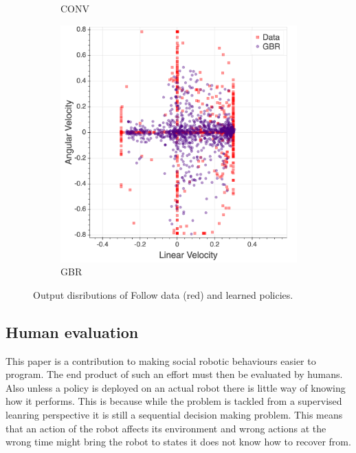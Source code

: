 \documentclass[letterpaper, 10 pt, conference]{ieeeconf}
\begin{document}
\begin{figure}[tbh]
\begin{subfigure}[b]{0.45\columnwidth}
    \caption{CONV}
    \label{fig:data}
  \end{subfigure}
  \hspace{5mm}
  \begin{subfigure}[b]{0.45\columnwidth}
    \includegraphics[scale = 0.09]{images/gbr_dist.png}

    \caption{GBR}
       \label{fig:data3}
  \end{subfigure} 
  \caption{Output disributions of Follow data (red) and learned policies.}

    \vspace{-2mm}
  \label{fig:data4}
  \end{figure}


\subsection{Human evaluation}
This paper is a contribution to making social robotic behaviours easier to program. The end product of such an effort must then be evaluated by humans. Also unless a policy is deployed on an actual robot there is little way of knowing how it performs. This is because while the problem is tackled from a supervised leanring perspective it is still a sequential decision making problem. This means that an action of the robot affects its environment and wrong actions at the wrong time might bring the robot to states it does not know how to recover from.
\end{document}
